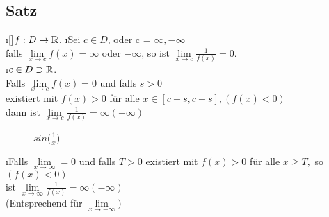 \subsection[Satz: Grenzwerte gegen unendlich]{Satz}\label{sec:4.16}
\begin{enumerate}[a)]
\i[]$f : D \rightarrow \mathbb{R}$.
\i Sei $c \in \bar{D}$, oder c = $\infty, - \infty $\\
falls $\lim\limits_{x \rightarrow c} f(x) = \infty$ oder $-\infty$, so ist $\lim\limits_{x \rightarrow c} \frac{1}{f(x)} = 0.$\\
\i $c \in \bar{D} \supset \mathbb{R}$.\\
Falls $\lim\limits_{x \rightarrow c} f(x) = 0$ und falls $s > 0$\\
existiert mit $f(x) > 0$ für alle $x \in [c-s,c+s], (f(x) < 0)$ \\
dann ist $\lim\limits_{x \rightarrow c} \frac{1}{f(x)} = \infty (-\infty)$
\begin{figure*}[h!]
\centering
{}
\caption{$sin(\frac{1}{x}$)}
\end{figure*}
\i Falls $\lim\limits_{x \rightarrow \infty} =0$ und falls $T >0$ existiert mit $f(x) > 0 $ für alle $x \geq T ,$ so $(f(x) < 0)$\\
ist $\lim\limits_{x \rightarrow \infty} \frac{1}{f(x)} = \infty (- \infty)$\\
(Entsprechend für $\lim\limits_{x \rightarrow - \infty})$
\end{enumerate}

